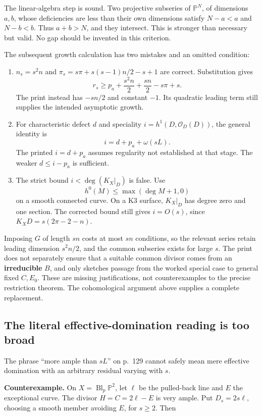 The linear-algebra step is sound. Two projective subseries of \(\mathbb P^N\), of dimensions \(a,b\), whose deficiencies are less than their own dimensions satisfy \(N-a<a\) and \(N-b<b\). Thus \(a+b>N\), and they intersect. This is stronger than necessary but valid. No gap should be invented in this criterion.

The subsequent growth calculation has two mistakes and an omitted condition:

\begin{enumerate}
\item
  \(n_s=s^2n\) and \(\pi_s=s\pi+s(s-1)n/2-s+1\) are correct. Substitution gives \[
  r_s\ge p_a+\frac{s^2n}{2}+\frac{sn}{2}-s\pi+s.
  \] The print instead has \(-sn/2\) and constant \(-1\). Its quadratic leading term still supplies the intended asymptotic growth.
\item
  For characteristic defect \(d\) and speciality \(i=h^1(D,\mathcal O_D(D))\), the general identity is \[
  i=d+p_a+\omega(sL).
  \] The printed \(i=d+p_a\) assumes regularity not established at that stage. The weaker \(d\le i-p_a\) is sufficient.
\item
  The strict bound \(i<\deg(K_X|_D)\) is false. Use \[
  h^0(M)\le\max(\deg M+1,0)
  \] on a smooth connected curve. On a K3 surface, \(K_X|_D\) has degree zero and one section. The corrected bound still gives \(i=O(s)\), since \(K_X D=s(2\pi-2-n)\).
\end{enumerate}

Imposing \(G\) of length \(sn\) costs at most \(sn\) conditions, so the relevant series retain leading dimension \(s^2n/2\), and the common subseries exists for large \(s\). The print does not separately ensure that a suitable common divisor comes from an \textbf{irreducible} \(B\), and only sketches passage from the worked special case to general fixed \(C,E_0\). These are missing justifications, not counterexamples to the precise restriction theorem. The cohomological argument above supplies a complete replacement.

\subsection{The literal effective-domination reading is too broad}

The phrase ``more ample than \(sL\)'' on p.~129 cannot safely mean mere effective domination with an arbitrary residual varying with \(s\).

\textbf{Counterexample.} On \(X=\operatorname{Bl}_p\mathbb P^2\), let \(\ell\) be the pulled-back line and \(E\) the exceptional curve. The divisor \(H=C=2\ell-E\) is very ample. Put \(D_s=2s\ell\), choosing a smooth member avoiding \(E\), for \(s\ge2\). Then

